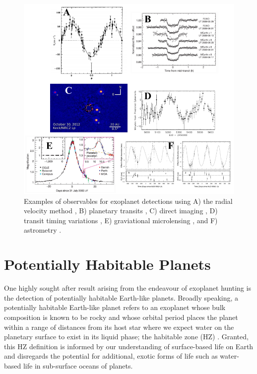 \begin{figure}
  \centering
  \includegraphics[width=\textwidth]{figures/detection_methods.png}
  \caption{Examples of observables for exoplanet detections using A)
    the radial velocity method \citep{mayor95}, B) planetary transits
    \citep{charbonneau09}, C) direct imaging \citep{currie14},
    D) transit timing variations \citep{ballard11},
    E) graviational microlensing \citep{beaulieu06}, and
    F) astrometry \citep{sahlmann13}.}
  \label{fig:detection}
\end{figure}


\iffalse
\section{Potentially Habitable Planets} \label{sect:HZ}
One highly sought after result arising from the endeavour of exoplanet hunting 
is the detection of potentially habitable Earth-like planets. 
Broadly speaking, a potentially habitable Earth-like planet refers to 
an exoplanet whose bulk composition is known to be rocky and whose 
orbital period places the planet within a range of distances from its host star 
where we expect water on the planetary surface to exist in its liquid phase; 
the habitable zone (HZ) \citep{dole64, hart79}. Granted, this HZ 
definition is 
informed by our understanding of surface-based life on Earth and disregards 
the potential for additional, exotic forms of life such as water-based life 
in sub-surface oceans of planets. \\

